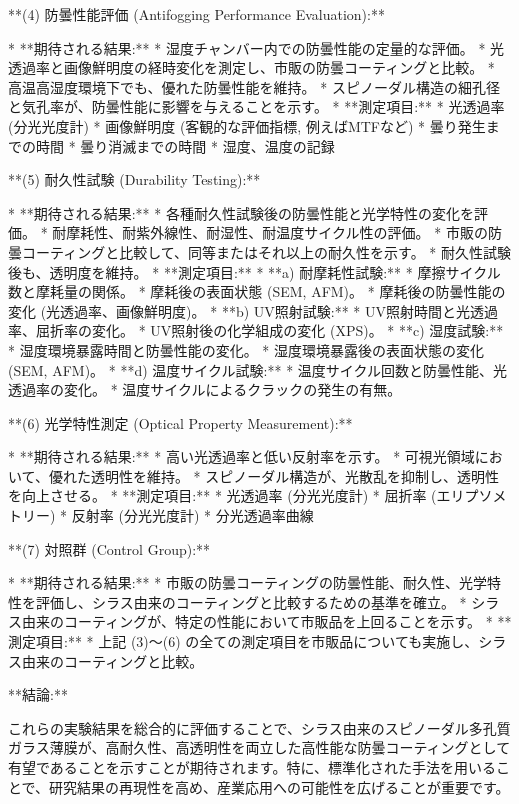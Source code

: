 \documentclass{article}
\begin{document}
**(4) 防曇性能評価 (Antifogging Performance Evaluation):**

*   **期待される結果:**
    *   湿度チャンバー内での防曇性能の定量的な評価。
    *   光透過率と画像鮮明度の経時変化を測定し、市販の防曇コーティングと比較。
    *   高温高湿度環境下でも、優れた防曇性能を維持。
    *   スピノーダル構造の細孔径と気孔率が、防曇性能に影響を与えることを示す。
*   **測定項目:**
    *   光透過率 (分光光度計)
    *   画像鮮明度 (客観的な評価指標,  例えばMTFなど)
    *   曇り発生までの時間
    *   曇り消滅までの時間
    *   湿度、温度の記録

**(5) 耐久性試験 (Durability Testing):**

*   **期待される結果:**
    *   各種耐久性試験後の防曇性能と光学特性の変化を評価。
    *   耐摩耗性、耐紫外線性、耐湿性、耐温度サイクル性の評価。
    *   市販の防曇コーティングと比較して、同等またはそれ以上の耐久性を示す。
    *   耐久性試験後も、透明度を維持。
*   **測定項目:**
    *   **a) 耐摩耗性試験:**
        *   摩擦サイクル数と摩耗量の関係。
        *   摩耗後の表面状態 (SEM, AFM)。
        *   摩耗後の防曇性能の変化 (光透過率、画像鮮明度)。
    *   **b) UV照射試験:**
        *   UV照射時間と光透過率、屈折率の変化。
        *   UV照射後の化学組成の変化 (XPS)。
    *   **c) 湿度試験:**
        *   湿度環境暴露時間と防曇性能の変化。
        *   湿度環境暴露後の表面状態の変化 (SEM, AFM)。
    *   **d) 温度サイクル試験:**
        *   温度サイクル回数と防曇性能、光透過率の変化。
        *   温度サイクルによるクラックの発生の有無。

**(6) 光学特性測定 (Optical Property Measurement):**

*   **期待される結果:**
    *   高い光透過率と低い反射率を示す。
    *   可視光領域において、優れた透明性を維持。
    *   スピノーダル構造が、光散乱を抑制し、透明性を向上させる。
*   **測定項目:**
    *   光透過率 (分光光度計)
    *   屈折率 (エリプソメトリー)
    *   反射率 (分光光度計)
    *   分光透過率曲線

**(7) 対照群 (Control Group):**

*   **期待される結果:**
    *   市販の防曇コーティングの防曇性能、耐久性、光学特性を評価し、シラス由来のコーティングと比較するための基準を確立。
    *   シラス由来のコーティングが、特定の性能において市販品を上回ることを示す。
*   **測定項目:**
    *   上記 (3)～(6) の全ての測定項目を市販品についても実施し、シラス由来のコーティングと比較。

**結論:**

これらの実験結果を総合的に評価することで、シラス由来のスピノーダル多孔質ガラス薄膜が、高耐久性、高透明性を両立した高性能な防曇コーティングとして有望であることを示すことが期待されます。特に、標準化された手法を用いることで、研究結果の再現性を高め、産業応用への可能性を広げることが重要です。
\end{document}
